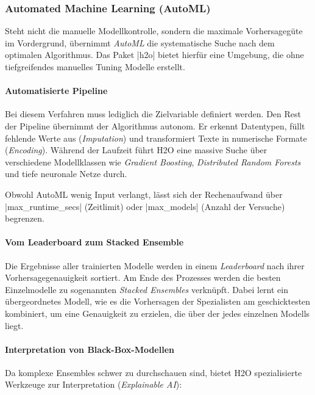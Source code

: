 \documentclass[10pt,twocolumn]{scrartcl}
\renewcommand{\lstinline}{\mycoloredinline}
\begin{document}
\subsubsection{Automated Machine Learning (AutoML)}

Steht nicht die manuelle Modellkontrolle, sondern die maximale Vorhersagegüte im Vordergrund, übernimmt \emph{AutoML} die systematische Suche nach dem optimalen Algorithmus. Das Paket \lstinline|h2o| bietet hierfür eine Umgebung, die ohne tiefgreifendes manuelles Tuning Modelle erstellt.

\paragraph{Automatisierte Pipeline}

Bei diesem Verfahren muss lediglich die Zielvariable definiert werden. Den Rest der Pipeline übernimmt der Algorithmus autonom. Er erkennt Datentypen, füllt fehlende Werte aus (\emph{Imputation}) und transformiert Texte in numerische Formate (\emph{Encoding}). Während der Laufzeit führt H2O eine massive Suche über verschiedene Modellklassen wie \emph{Gradient Boosting}, \emph{Distributed Random Forests} und tiefe neuronale Netze durch.

Obwohl AutoML wenig Input verlangt, lässt sich der Rechenaufwand über \lstinline|max_runtime_secs| (Zeitlimit) oder \lstinline|max_models| (Anzahl der Versuche) begrenzen.

\paragraph{Vom Leaderboard zum Stacked Ensemble}

Die Ergebnisse aller trainierten Modelle werden in einem \emph{Leaderboard} nach ihrer Vorhersagegenauigkeit sortiert. Am Ende des Prozesses werden die besten Einzelmodelle zu sogenannten \emph{Stacked Ensembles} verknüpft. Dabei lernt ein übergeordnetes Modell, wie es die Vorhersagen der Spezialisten am geschicktesten kombiniert, um eine Genauigkeit zu erzielen, die über der jedes einzelnen Modells liegt.

\paragraph{Interpretation von Black-Box-Modellen}

Da komplexe Ensembles schwer zu durchschauen sind, bietet H2O spezialisierte Werkzeuge zur Interpretation (\emph{Explainable AI}):
\end{document}
